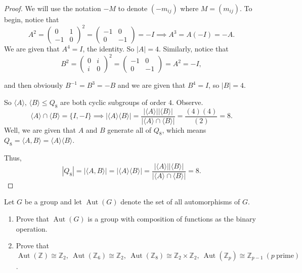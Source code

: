 \documentclass[addpoints,10pt]{exam}
\theoremstyle{plain}
\theoremstyle{definition}
\newtheorem{prob}[thm]{Problem}
\theoremstyle{plain}
\theoremstyle{plain}
\theoremstyle{definition}
\let\oldprob\prob
\let\endoldprob\endprob
\renewenvironment{prob}
  {\begin{singlespace}\oldprob}
  {\endoldprob\end{singlespace}}
\begin{document}
\begin{proof} We will use the notation $-M$ to denote $(-m_{ij})$ where $M=(m_{ij})$. To begin, notice that
  $$A^{2}=\begin{pmatrix}
    0 & 1\\
    -1 & 0
  \end{pmatrix}^{2}=\begin{pmatrix}
    -1 & 0 \\
    0 & -1
  \end{pmatrix}=-I\implies A^{3}=A(-I)=-A.$$ We are given that $A^{4}=I$, the identity. So $|A|=4$. Similarly, notice that
  $$B^{2}=\begin{pmatrix}
    0 & i\\
    i & 0
  \end{pmatrix}^{2}=\begin{pmatrix}
    -1 & 0 \\
    0 & -1
  \end{pmatrix}=A^{2}=-I,$$
  
 and then obviously $B^{-1}=B^{3}=-B$ and we are given that $B^{4}=I$, so $|B|=4$. 
 
 So $\langle A\rangle,\,\langle B \rangle \leq Q_{8}$ are both cyclic subgroups of order $4$. Observe.
  $$\langle A\rangle \cap \langle B\rangle = \{I,-I\}\implies |\langle A\rangle\langle B\rangle|=\frac{|\langle A\rangle||\langle B\rangle|}{|\langle A\rangle \cap \langle B\rangle|}=\frac{(4)(4)}{(2)}=8.$$
  Well, we are given that $A$ and $B$ generate all of $Q_{8}$, which means $Q_{8}=\langle A,B\rangle =\langle A\rangle\langle B\rangle$.

  Thus,
  $$|Q_{8}|=|\langle A,B\rangle|=|\langle A\rangle\langle B\rangle|=\frac{|\langle A\rangle||\langle B\rangle|}{|\langle A\rangle \cap \langle B\rangle|}=8.$$
\end{proof}
\endgroup
\newpage

\begin{prob}
  Let $G$ be a group and let $\operatorname{Aut}(G)$ denote the set of all automorphisms of $G$.
  \begin{enumerate}[label=(\alph*)]
  \item Prove that $\operatorname{Aut}(G)$ is a group with composition of functions as the binary operation.
  \item Prove that $\operatorname{Aut}(\mathbb{Z}) \cong \mathbb{Z}_2,\ 
  \operatorname{Aut}(\mathbb{Z}_6)\cong \mathbb{Z}_2,\
  \operatorname{Aut}(\mathbb{Z}_8)\cong \mathbb{Z}_2 \times \mathbb{Z}_2,\
  \operatorname{Aut}(\mathbb{Z}_p)\cong \mathbb{Z}_{p-1}\ (p\ \text{prime})$.
\end{enumerate}
\end{prob}
\end{document}
